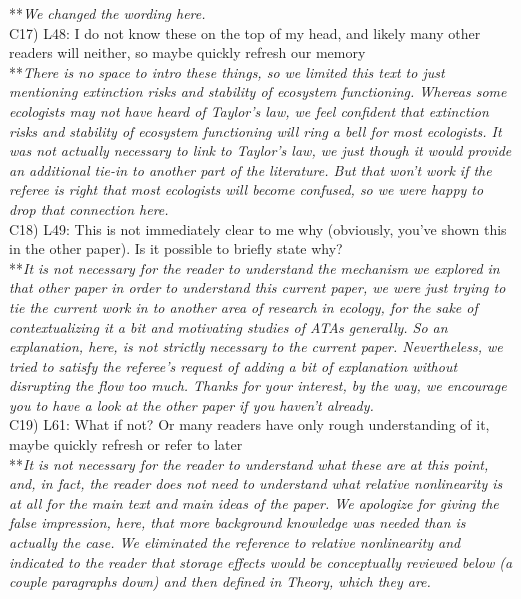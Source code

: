 \documentclass[letterpaper,11pt]{article}
\begin{document}
\noindent ***\emph{We changed the wording here.} \\

\noindent C17) L48: I do not know these on the top of my head, and likely many other readers will neither, so maybe quickly refresh our memory \\

\noindent ***\emph{There is no space to intro these things, so we limited this text to just mentioning 
extinction risks and stability of ecosystem functioning. Whereas some ecologists may not have heard of 
Taylor's law, we feel confident that extinction risks and stability of ecosystem functioning will ring
a bell for most ecologists. It was not actually necessary to link to Taylor's law, we just though it 
would provide an additional tie-in to another part of the literature. But that won't work if the referee is right 
that most ecologists will become confused, so we were happy to drop that connection here.} \\

\noindent C18) L49: This is not immediately clear to me why (obviously, you’ve shown this in the other paper). Is it possible to briefly state why? \\

\noindent ***\emph{It is not necessary for the reader to understand the mechanism we explored in that other
paper in order to understand this current paper, we were just trying to tie the current work in to 
another area of research in ecology, for the sake of contextualizing it a bit and motivating studies of ATAs generally. 
So an explanation, here, is not 
strictly necessary to the current paper. Nevertheless, we tried to satisfy the referee's request of adding a bit of explanation
without disrupting the flow too much. Thanks for your interest, by the way, we encourage you to have a look at the
other paper if you haven't already.} \\

\noindent C19) L61: What if not? Or many readers have only rough understanding of it, maybe quickly refresh or refer to later \\

\noindent ***\emph{It is not necessary for the reader to understand what these are at this point, and,
in fact, the reader does not need to understand what relative nonlinearity is at all for the main text
and main ideas of the paper. We apologize for giving the false impression, here, that more background knowledge was needed
than is actually the case. We eliminated the reference to relative nonlinearity and indicated to the 
reader that storage effects would be conceptually reviewed below (a couple paragraphs down) and then 
defined in Theory, which they are.} \\
\end{document}
